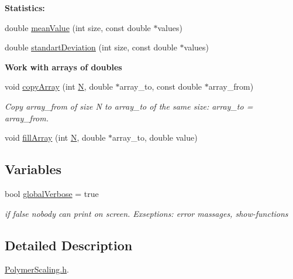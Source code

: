 \begin{Indent}{\bf Statistics\+:}\par
\begin{DoxyCompactItemize}
\item 
double \hyperlink{namespace_p_c_a_a330e0aee67470237e1e755eb5b151d6c}{mean\+Value} (int size, const double $\ast$values)
\item 
double \hyperlink{namespace_p_c_a_ae9120f4f9875a87768cc3090196892a8}{standart\+Deviation} (int size, const double $\ast$values)
\end{DoxyCompactItemize}
\end{Indent}
\begin{Indent}{\bf Work with arrays of doubles}\par
\begin{DoxyCompactItemize}
\item 
void \hyperlink{namespace_p_c_a_ac0ca09771710ce44c06d3f5f4402fd80}{copy\+Array} (int \hyperlink{map_end_to_end_movie_8m_ab973269d31a5338a6f7b4937ab3fc8d9}{N}, double $\ast$array\+\_\+to, const double $\ast$array\+\_\+from)
\begin{DoxyCompactList}\small\item\em Copy array\+\_\+from of size N to array\+\_\+to of the same size\+: array\+\_\+to = array\+\_\+from. \end{DoxyCompactList}\item 
void \hyperlink{namespace_p_c_a_af4a7844595578d2c8e09635fba6db3b2}{fill\+Array} (int \hyperlink{map_end_to_end_movie_8m_ab973269d31a5338a6f7b4937ab3fc8d9}{N}, double $\ast$array\+\_\+to, double value)
\end{DoxyCompactItemize}
\end{Indent}
\subsection*{Variables}
\begin{DoxyCompactItemize}
\item 
bool \hyperlink{namespace_p_c_a_a01cf2b18a2d7669f5be721c2142bf67d}{global\+Verbose} = true
\begin{DoxyCompactList}\small\item\em if false nobody can print on screen. Exseptions\+: error massages, show-\/functions \end{DoxyCompactList}\end{DoxyCompactItemize}


\subsection{Detailed Description}
\hyperlink{_polymer_scaling_8h}{Polymer\+Scaling.\+h}. 

